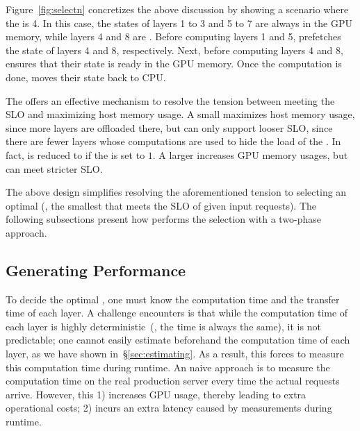 
Figure~\ref{fig:selectn} concretizes the above discussion by showing a scenario where the \interval is 4. 
%
In this case, the states of layers 1 to 3 and 5 to 7 are always in the GPU memory, while layers 4 and 8 are \oflayer. 
%
Before computing layers 1 and 5, \sys prefetches the state of layers 4 and 8, respectively. 
%
Next, before computing layers 4 and 8, \sys ensures that their state 
is ready in the GPU memory. 
%
Once the computation is done, \sys moves their state back to CPU. 

The \interval offers an effective mechanism to resolve the tension between meeting the SLO and maximizing host memory usage. 
%
A small \interval maximizes host memory usage, since more layers are offloaded there, but can only support looser SLO, since there are fewer layers 
whose computations are used to hide the load of the \oflayer. 
%
In fact, \sys is reduced to \deepspeed if the \interval is set to $1$. 
%
A larger \interval increases GPU memory usages, but can meet stricter SLO. 
%

The above design simplifies resolving the aforementioned tension to 
selecting an optimal (\ie, the smallest \interval that meets the SLO of given input requests). 
%
The following subsections present how \sys performs the selection with a 
two-phase approach. 

\subsection{Generating Performance \Record}
\label{sec:generatingperformance}

%
To decide the optimal \interval, one must know the computation time and the transfer time of each layer. 
%
A challenge \sys encounters is that while the computation time of each layer 
is highly deterministic~(\ie, the time is always the same), it is not
predictable; one cannot easily estimate beforehand the computation time 
of each layer, as we have shown in~\S\ref{sec:estimating}. 
%
As a result, this forces \sys to measure this computation time during runtime. 
%
An naive approach is to measure the computation time on the real production server every time the actual requests arrive. 
%
However, this 1) increases GPU usage, thereby 
leading to extra operational costs; 2) incurs an extra latency caused by 
measurements during runtime. 


